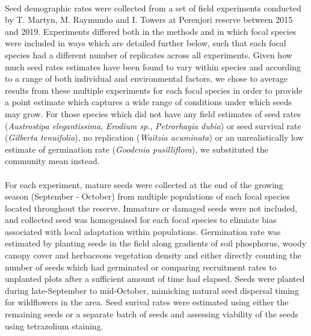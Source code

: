\begin{refsection}
        \paragraph{}
        Seed demographic rates were collected from a set of field experiments conducted by T. Martyn, M. Raymundo and I. Towers at Perenjori reserve between 2015 and 2019. Experiments differed both in the methods and in which focal species were included in ways which are detailed further below, such that each focal species had a different number of replicates across all experiments. Given how much seed rates estimates have been found to vary within species and according to a range of both individual and environmental factors, we chose to average results from these multiple experiments for each focal species in order to provide a point estimate which captures a wide range of conditions under which seeds may grow. For those species which did not have any field estimates of seed rates (\textit{Austrostipa elegantissima}, \textit{Erodium sp.}, \textit{Petrorhagia dubia}) or seed survival rate (\textit{Gilberta tenuifolia}), no replication (\textit{Waitzia acuminata}) or an unrealistically low estimate of germination rate (\textit{Goodenia pusilliflora}), we substituted the community mean instead. 

        \paragraph{}
        For each experiment, mature seeds were collected at the end of the growing season (September - October) from multiple populations of each focal species located throughout the reserve. Immature or damaged seeds were not included, and collected seed was homogenised for each focal species to elimiate bias associated with local adaptation within populations. Germination rate was estimated by planting seeds in the field along gradients of soil phosphorus, woody canopy cover and herbaceous vegetation density and either directly counting the number of seeds which had germinated or comparing recruitment rates to unplanted plots after a sufficient amount of time had elapsed. Seeds were planted during late-September to mid-October, mimicking natural seed dispersal timing for wildflowers in the area. Seed surival rates were estimated using either the remaining seeds or a separate batch of seeds and assessing viability of the seeds using tetrazolium staining. 



\end{refsection}
